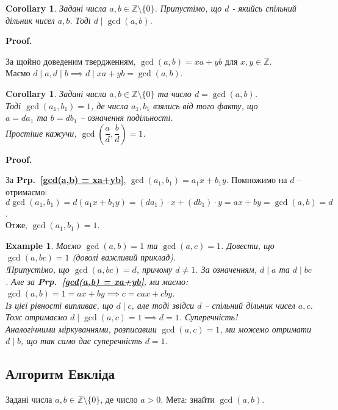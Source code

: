 \documentclass[a4paper, 14pt]{extarticle}
\makeatletter
\theoremstyle{theoremdd}
\theoremstyle{theoremdd}
\theoremstyle{theoremdd}
\theoremstyle{theoremdd}
\newtheorem{example}[theorem]{Example}
\theoremstyle{theoremdd}
\theoremstyle{theoremdd}
\theoremstyle{theoremdd}
\theoremstyle{theoremdd}
\newtheorem{corollary}[theorem]{Corollary}
\def\qed{$\blacksquare$}
\renewenvironment{proof}[1][Proof.\\]{\par
\pushQED{\hfill \qed}%
\normalfont \topsep6\p@\@plus6\p@\relax
\trivlist
\item\relax
{\bfseries
#1\@addpunct{.}}\hspace\labelsep\ignorespaces
}{%
\popQED\endtrivlist\@endpefalse
}
\newcommand\prpref[1]{\textbf{Prp.~\ref{#1}}}
\makeatother
\begin{document}
\begin{corollary}
Задані числа $a,b \in \mathbb{Z} \setminus \{0\}$. Припустімо, що $d$ - якийсь спільний дільник чисел $a,b$. Тоді $d \mid \gcd(a,b)$.
\end{corollary}

\begin{proof}
За щойно доведеним твердженням, $\gcd(a,b) = xa + yb$ для $x,y \in \mathbb{Z}$.\\
Маємо $d \mid a, d \mid b \implies d \mid xa + yb = \gcd(a,b)$.
\end{proof}

\begin{corollary}
Задані числа $a,b \in \mathbb{Z} \setminus \{0\}$ та число $d = \gcd(a,b)$.\\
Тоді $\gcd(a_1,b_1) = 1$, де числа $a_1,b_1$ взялись від того факту, що\\
$a = da_1$ та $b = db_1$ -- означення подільності.\\
Простіше кажучи, $\gcd\left( \dfrac{a}{d}, \dfrac{b}{d} \right) = 1$.
\end{corollary}

\begin{proof}
За \prpref{gcd(a,b) = xa+yb}, $\gcd (a_1,b_1) = a_1 x + b_1 y$. Помножимо на $d$ -- отримаємо:\\
$d \gcd (a_1,b_1) = d(a_1x+b_1y) = (da_1) \cdot x + (db_1) \cdot y = ax + by = \gcd (a,b) = d$.\\
Отже, $\gcd(a_1,b_1) = 1$.
\end{proof}

\begin{example}
Маємо $\gcd(a,b) = 1$ та $\gcd(a,c) = 1$. Довести, що $\gcd(a,bc) = 1$ (доволі важливий приклад).\\
!Припустімо, що $\gcd(a,bc) = d$, причому $d \neq 1$. За означенням, $d \mid a$ та $d \mid bc$. Але за \prpref{gcd(a,b) = xa+yb}, ми маємо:\\
$\gcd(a,b) = 1 = ax + by \implies c = cax + cby$.\\
Із цієї рівності випливає, що $d \mid c$, але тоді звідси $d$ -- спільний дільник чисел $a,c$. Тож отримаємо $d \mid \gcd(a,c) = 1 \implies d = 1$. Суперечність!\\
Аналогічними міркуваннями, розписавши $\gcd(a,c) = 1$, ми можемо отримати $d \mid b$, що так само дає суперечність $d = 1$.
\end{example}

\subsection{Алгоритм Евкліда}
Задані числа $a,b \in \mathbb{Z} \setminus \{0\}$, де число $a > 0$. Мета: знайти $\gcd(a,b)$.
\end{document}
